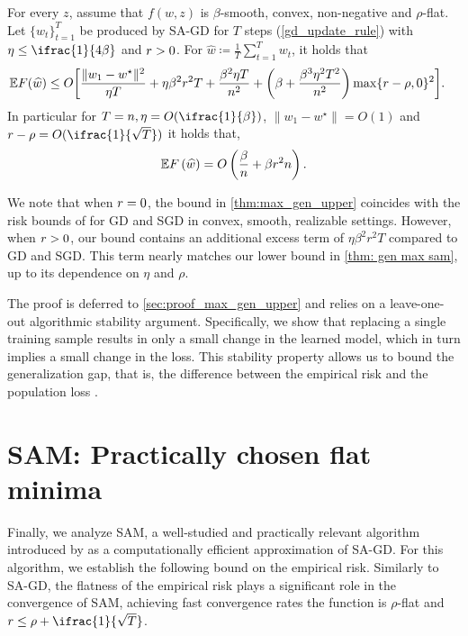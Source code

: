 \begin{theorem}
\label{thm:max_gen_upper}
For every $z$, assume that $f(w,z)$ is
$\beta$-smooth, convex, non-negative and $\rho$-flat. Let $\{w_t\}_{t=1}^T$ be produced by SA-GD for $T$ steps
(\cref{gd_update_rule}) with $\eta \leq \ifrac{1}{4\beta}$ and $r >0$. For $\widehat{w} \coloneqq \frac{1}{T}\sum_{t=1}^T w_t$, it
holds that
\begin{align*}
    \mathbb E F (\widehat{w}) 
    \leq
    O& \bigg[\frac{\|w_1-w^\star\|^2}{\eta T} + \eta \beta^2 r  ^2  T+ \frac{\beta^2\eta T}{n^2} 
      +\bigg(\beta+\frac{\beta^3\eta^2 T^2}{n^2}\bigg)\max\{r - \rho, 0\}^2 \bigg]
    .
\end{align*}
In particular for  $T=n, \eta=O(\ifrac{1}{\beta})$, $\|w_1-w^\star\|=O(1)$ and $\rad-\rho=O(\ifrac{1}{\sqrt{T}})$ it holds that,
\begin{align*}
    \mathbb E F \left(\widehat{w}\right)= 
    O\left(\frac{\beta}{n}+ \beta r^2 n \right).
\end{align*}
\end{theorem}
We note that when $r = 0$, the bound in \cref{thm:max_gen_upper} coincides with the risk bounds of \citet{nikolakakis2022beyond, lei2020fine} for GD and SGD in convex, smooth, realizable settings. However, when $r > 0$, our bound contains an additional excess term of $\eta \beta^2 r^2 T$ compared to GD and SGD. This term nearly matches our lower bound in \cref{thm: gen max sam}, up to its dependence on $\eta$ and $\rho$.

The proof is deferred to \cref{sec:proof_max_gen_upper} and relies on a leave-one-out algorithmic stability argument. Specifically, we show that replacing a single training sample results in only a small change in the learned model, which in turn implies a small change in the loss. This stability property allows us to bound the generalization gap, that is, the difference between the empirical risk and the population loss \cite{bousquet2002stability,hardt2016train}. 



\section{SAM: Practically chosen flat minima} \label{sec:sam}

Finally, we analyze SAM, a well-studied and practically relevant algorithm introduced by \cite{foret2021sharpness} as a computationally efficient approximation of SA-GD. For this algorithm, we establish the following bound on the empirical risk. 
Similarly to SA-GD, the flatness of the empirical risk plays a significant role in the convergence of SAM, 
achieving fast convergence rates the function is $\rho$-flat and $\rad\leq \rho + \ifrac{1}{\sqrt{T}}$.

